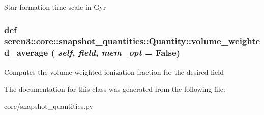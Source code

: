 \label{classseren3_1_1core_1_1snapshot__quantities_1_1Quantity_a4c619864800c24af98334167387ea2f6}
\begin{DoxyVerb}
Star formation time scale in Gyr
\end{DoxyVerb}
 \hypertarget{classseren3_1_1core_1_1snapshot__quantities_1_1Quantity_a3295c3ce11ea5f4e16163849820c6223}{
\subsubsection[{volume\_\-weighted\_\-average}]{\setlength{\rightskip}{0pt plus 5cm}def seren3::core::snapshot\_\-quantities::Quantity::volume\_\-weighted\_\-average ( {\em self}, \/   {\em field}, \/   {\em mem\_\-opt} = {\ttfamily False})}}
\label{classseren3_1_1core_1_1snapshot__quantities_1_1Quantity_a3295c3ce11ea5f4e16163849820c6223}
\begin{DoxyVerb}
Computes the volume weighted ionization fraction for the desired field
\end{DoxyVerb}
 

The documentation for this class was generated from the following file:\begin{DoxyCompactItemize}
\item 
core/snapshot\_\-quantities.py\end{DoxyCompactItemize}
